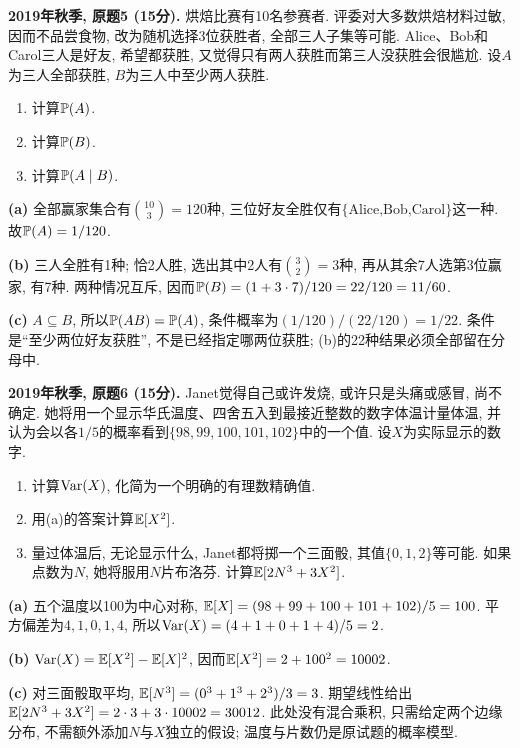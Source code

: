 \begin{exercise}\label{ex:m1-2019f-q5}
\textbf{2019年秋季, 原题5 (15分).} 烘焙比赛有10名参赛者. 评委对大多数烘焙材料过敏, 因而不品尝食物, 改为随机选择3位获胜者, 全部三人子集等可能. Alice、Bob和Carol三人是好友, 希望都获胜, 又觉得只有两人获胜而第三人没获胜会很尴尬. 设$A$为三人全部获胜, $B$为三人中至少两人获胜.
\begin{enumerate}\item[(a)]\label{ex:m1-2019f-q5-a} 计算$\mathbb P(A)$.\item[(b)]\label{ex:m1-2019f-q5-b} 计算$\mathbb P(B)$.\item[(c)]\label{ex:m1-2019f-q5-c} 计算$\mathbb P(A\mid B)$.\end{enumerate}
\end{exercise}
\begin{solution}
\textbf{(a)}\label{sol:m1-2019f-q5-a} 全部赢家集合有$\binom{10}{3}=120$种, 三位好友全胜仅有$\{\text{Alice,Bob,Carol}\}$这一种. 故$\mathbb P(A)=1/120$.

\textbf{(b)}\label{sol:m1-2019f-q5-b} 三人全胜有1种; 恰2人胜, 选出其中2人有$\binom32=3$种, 再从其余7人选第3位赢家, 有7种. 两种情况互斥, 因而$\mathbb P(B)=(1+3\cdot7)/120=22/120=11/60$.

\textbf{(c)}\label{sol:m1-2019f-q5-c} $A\subseteq B$, 所以$\mathbb P(AB)=\mathbb P(A)$, 条件概率为$(1/120)/(22/120)=1/22$. 条件是“至少两位好友获胜”, 不是已经指定哪两位获胜; (b)的22种结果必须全部留在分母中.
\end{solution}

\begin{exercise}\label{ex:m1-2019f-q6}
\textbf{2019年秋季, 原题6 (15分).} Janet觉得自己或许发烧, 或许只是头痛或感冒, 尚不确定. 她将用一个显示华氏温度、四舍五入到最接近整数的数字体温计量体温, 并认为会以各$1/5$的概率看到$\{98,99,100,101,102\}$中的一个值. 设$X$为实际显示的数字.
\begin{enumerate}
\item[(a)]\label{ex:m1-2019f-q6-a} 计算$\operatorname{Var}(X)$, 化简为一个明确的有理数精确值.
\item[(b)]\label{ex:m1-2019f-q6-b} 用(a)的答案计算$\mathbb E[X^2]$.
\item[(c)]\label{ex:m1-2019f-q6-c} 量过体温后, 无论显示什么, Janet都将掷一个三面骰, 其值$\{0,1,2\}$等可能. 如果点数为$N$, 她将服用$N$片布洛芬. 计算$\mathbb E[2N^3+3X^2]$.
\end{enumerate}
\end{exercise}
\begin{solution}
\textbf{(a)}\label{sol:m1-2019f-q6-a} 五个温度以100为中心对称, $\mathbb E[X]=(98+99+100+101+102)/5=100$. 平方偏差为$4,1,0,1,4$, 所以$\operatorname{Var}(X)=(4+1+0+1+4)/5=2$.

\textbf{(b)}\label{sol:m1-2019f-q6-b} $\operatorname{Var}(X)=\mathbb E[X^2]-\mathbb E[X]^2$, 因而$\mathbb E[X^2]=2+100^2=10002$.

\textbf{(c)}\label{sol:m1-2019f-q6-c} 对三面骰取平均, $\mathbb E[N^3]=(0^3+1^3+2^3)/3=3$. 期望线性给出$\mathbb E[2N^3+3X^2]=2\cdot3+3\cdot10002=30012$. 此处没有混合乘积, 只需给定两个边缘分布, 不需额外添加$N$与$X$独立的假设; 温度与片数仍是原试题的概率模型.
\end{solution}
